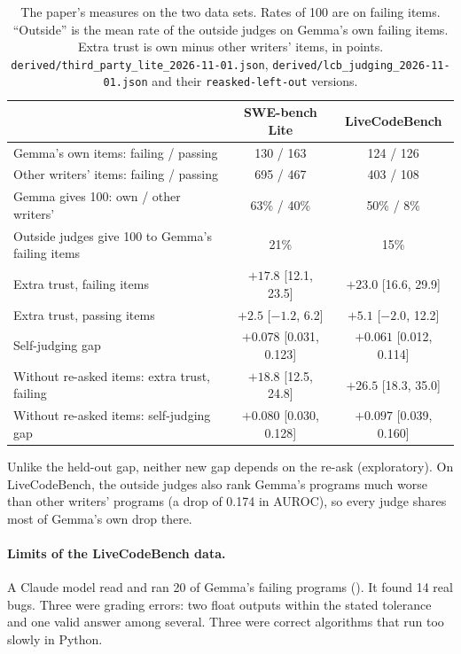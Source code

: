 \documentclass[10pt,letterpaper]{article}
\begin{document}
\begin{table}[H]
\centering
\small
\caption{The paper's measures on the two data sets. Rates of 100 are on failing items. ``Outside'' is the mean rate
of the outside judges on Gemma's own failing items. Extra trust is own minus other writers' items, in points.
\texttt{derived/third\_party\_lite\_2026-11-01.json}, \texttt{derived/lcb\_judging\_2026-11-01.json} and their
\texttt{reasked-left-out} versions.}
\label{tab:more}
\begin{tabular}{@{}lcc@{}}
\toprule
 & SWE-bench Lite & LiveCodeBench \\
\midrule
Gemma's own items: failing / passing & 130 / 163 & 124 / 126 \\
Other writers' items: failing / passing & 695 / 467 & 403 / 108 \\
Gemma gives 100: own / other writers' & 63\% / 40\% & 50\% / 8\% \\
Outside judges give 100 to Gemma's failing items & 21\% & 15\% \\
Extra trust, failing items & $+17.8$ [12.1, 23.5] & $+23.0$ [16.6, 29.9] \\
Extra trust, passing items & $+2.5$ [$-1.2$, 6.2] & $+5.1$ [$-2.0$, 12.2] \\
Self-judging gap & $+0.078$ [0.031, 0.123] & $+0.061$ [0.012, 0.114] \\
\midrule
Without re-asked items: extra trust, failing & $+18.8$ [12.5, 24.8] & $+26.5$ [18.3, 35.0] \\
Without re-asked items: self-judging gap & $+0.080$ [0.030, 0.128] & $+0.097$ [0.039, 0.160] \\
\bottomrule
\end{tabular}
\end{table}

Unlike the held-out gap, neither new gap depends on the re-ask (exploratory). On LiveCodeBench, the outside judges also
rank Gemma's programs much worse than other writers' programs (a drop of 0.174 in AUROC), so every judge shares most of
Gemma's own drop there.

\paragraph{Limits of the LiveCodeBench data.} A Claude model read and ran 20 of Gemma's failing programs
(). It found 14 real bugs. Three were grading errors: two float outputs
within the stated tolerance and one valid answer among several. Three were correct algorithms that run too slowly in
Python.
\end{document}

